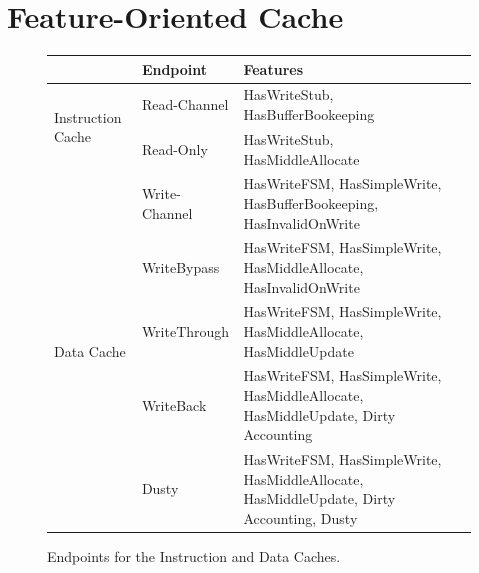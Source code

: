 \documentclass[conference]{IEEEtran}
\begin{document}

\section{Feature-Oriented Cache}
\begin{figure}[ht]
    \centering
\scriptsize
\begin{tabular}{llll}\toprule
&Endpoint &Features \\\midrule
\multirow{2}{*}{Instruction Cache} &Read-Channel &HasWriteStub, HasBufferBookeeping \\
&Read-Only &HasWriteStub, HasMiddleAllocate \\\midrule
\multirow{5}{*}{Data Cache} &Write-Channel &HasWriteFSM, HasSimpleWrite, HasBufferBookeeping, HasInvalidOnWrite \\
&WriteBypass &HasWriteFSM, HasSimpleWrite, HasMiddleAllocate, HasInvalidOnWrite \\
&WriteThrough &HasWriteFSM, HasSimpleWrite, HasMiddleAllocate, HasMiddleUpdate \\
&WriteBack &HasWriteFSM, HasSimpleWrite, HasMiddleAllocate, HasMiddleUpdate, Dirty Accounting \\
&Dusty &HasWriteFSM, HasSimpleWrite, HasMiddleAllocate, HasMiddleUpdate, Dirty Accounting, Dusty \\
\bottomrule
\end{tabular}
    \caption{Endpoints for the Instruction and Data Caches.}
    \label{fig:Endpoints}
\end{figure}
\end{document}
